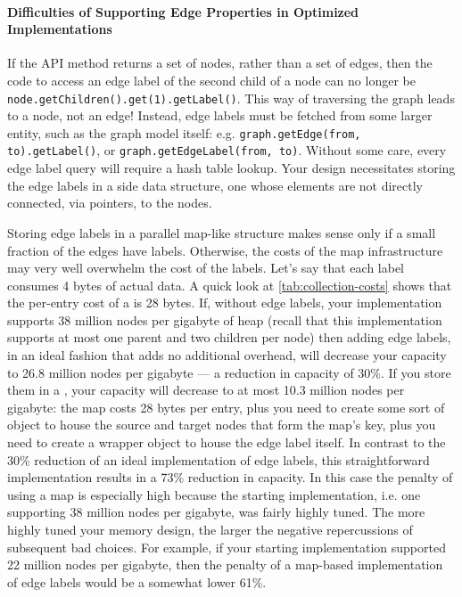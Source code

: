 \paragraph{Difficulties of Supporting Edge Properties in Optimized
Implementations} If the API method  returns a set of
nodes, rather than a set of edges, then the code to access an edge label of the
second child of a node can no longer be
\texttt{node.getChildren().\-get(1).getLabel()}. This way of traversing the graph
leads to a node, not an edge! Instead, edge labels must be fetched from some
larger entity, such as the graph model itself: e.g. \texttt{graph.getEdge(from,
to).getLabel()}, or \texttt{graph.getEdgeLabel(from, to)}. Without some care,
every edge label query will require a hash table lookup. Your design necessitates
storing the edge labels in a side data structure, one whose elements are not
directly connected, via pointers, to the nodes.

Storing edge labels in a parallel map-like structure makes sense only if a small
fraction of the edges have labels. Otherwise, the costs of the map infrastructure
may very well overwhelm the cost of the labels. Let's say that each label
consumes 4 bytes of actual data. A quick look at
\autoref{tab:collection-costs} shows that the per-entry cost of a 
is 28 bytes. If, without edge labels, your implementation supports 38 million
nodes per gigabyte of heap (recall that this implementation supports at most
one parent and two children per node)
then adding edge labels, in an ideal fashion that adds no additional overhead,
will decrease your capacity to 26.8 million nodes per gigabyte --- a reduction
in capacity of 30\%.
If you store them in a , your capacity will decrease to at most
10.3 million nodes per gigabyte: the map costs 28 bytes per entry,
plus you need to create some sort of  object to house the source and
target nodes that form the map's key, plus you need to create a wrapper object to
house the edge label itself.
In contrast to the 30\% reduction of an ideal implementation of edge labels,
this straightforward implementation results in a 73\% reduction in capacity. In
this case the penalty of using a map is especially high because the starting
implementation, i.e. one supporting 38 million nodes per gigabyte, was fairly
highly tuned. The more highly tuned your memory design, the larger the negative
repercussions of subsequent bad choices. For example, if your starting
implementation supported 22 million nodes per gigabyte, then the penalty of a
map-based implementation of edge labels would be a somewhat lower 61\%.

